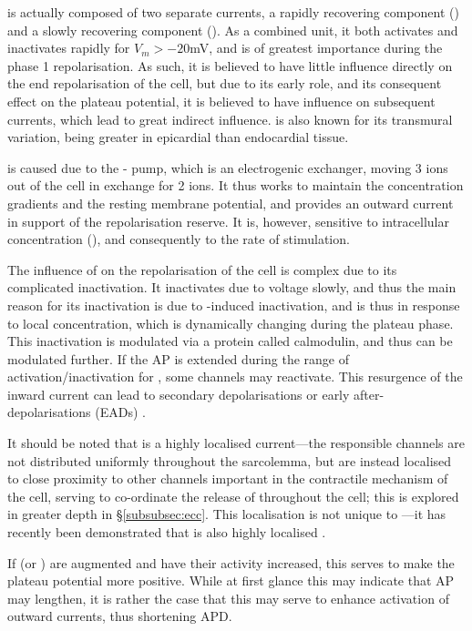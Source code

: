 \documentclass[../thesis-main.tex]{subfiles}
\begin{document}
\ito{} is actually composed of two separate currents, a rapidly recovering component (\itof{}) and a slowly recovering component (\itos{}). As a combined unit, it both activates and inactivates rapidly for $V_m > -20$mV, and is of greatest importance during the phase 1 repolarisation. As such, it is believed to have little influence directly on the end repolarisation of the cell, but due to its early role, and its consequent effect on the plateau potential, it is believed to have influence on subsequent currents, which lead to great indirect influence. \ito{} is also known for its transmural variation, being greater in epicardial than endocardial tissue.

\inak{} is caused due to the \na{}-\K{} pump, which is an electrogenic exchanger, moving 3 \na{} ions out of the cell in exchange for 2 \K{} ions. It thus works to maintain the concentration gradients and the resting membrane potential, and provides an outward current in support of the repolarisation reserve. It is, however, sensitive to intracellular \na{} concentration (\nai), and consequently to the rate of stimulation.

The influence of \ica{} on the repolarisation of the cell is complex due to its complicated inactivation. It inactivates due to voltage slowly, and thus the main reason for its inactivation is due to \ca{}-induced inactivation, and is thus in response to local \ca{} concentration, which is dynamically changing during the plateau phase. This inactivation is modulated via a protein called calmodulin, and thus can be modulated further. If the AP is extended during the range of activation/inactivation for \ica{}, some \ica{} channels may reactivate. This resurgence of the inward current can lead to secondary depolarisations or early after-depolarisations (EADs) \citep{Carmeliet2006}. 

It should be noted that \ica{} is a highly localised current---the responsible channels are not distributed uniformly throughout the sarcolemma, but are instead localised to close proximity to other channels important in the contractile mechanism of the cell, serving to co-ordinate the release of \ca{} throughout the cell; this is explored in greater depth in \S\ref{subsubsec:ecc}. This localisation is not unique to \ica{}---it has recently been demonstrated that \ina{} is also highly localised \citep{Bhargava2013}.

If \ica{} (or \ina{}) are augmented and have their activity increased, this serves to make the plateau potential more positive. While at first glance this may indicate that AP may lengthen, it is rather the case that this may serve to enhance activation of outward \K{} currents, thus shortening APD.
\end{document}
